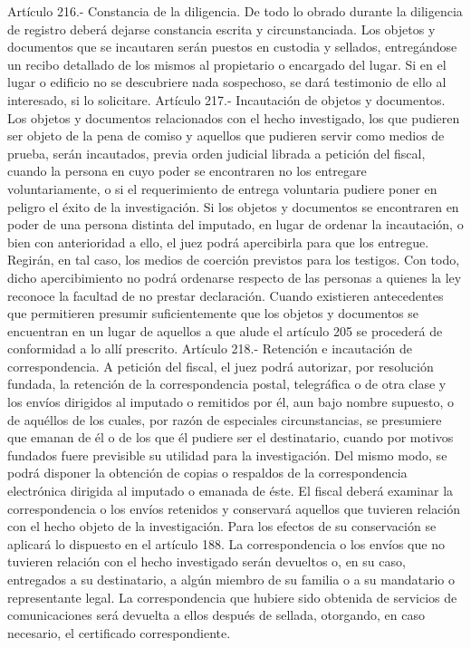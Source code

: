     Artículo 216.- Constancia de la diligencia. De todo lo obrado durante la diligencia de registro deberá dejarse constancia escrita y circunstanciada. Los objetos y documentos que se incautaren serán puestos en custodia y sellados, entregándose un recibo detallado de los mismos al propietario o encargado del lugar.
    Si en el lugar o edificio no se descubriere nada sospechoso, se dará testimonio de ello al interesado, si lo solicitare.
    Artículo 217.- Incautación de objetos y documentos. Los objetos y documentos relacionados con el hecho investigado, los que pudieren ser objeto de la pena de comiso y aquellos que pudieren servir como medios de prueba, serán incautados, previa orden judicial librada a petición del fiscal, cuando la persona en cuyo poder se encontraren no los entregare voluntariamente, o si el requerimiento de entrega voluntaria pudiere poner en peligro el éxito de la investigación.
    Si los objetos y documentos se encontraren en poder de una persona distinta del imputado, en lugar de ordenar la incautación, o bien con anterioridad a ello, el juez podrá apercibirla para que los entregue. Regirán, en tal caso, los medios de coerción previstos para los testigos. Con todo, dicho apercibimiento no podrá ordenarse respecto de las personas a quienes la ley reconoce la facultad de no prestar declaración.
    Cuando existieren antecedentes que permitieren presumir suficientemente que los objetos y documentos se encuentran en un lugar de aquellos a que alude el artículo 205 se procederá de conformidad a lo allí prescrito.
    Artículo 218.- Retención e incautación de correspondencia. A petición del fiscal, el juez podrá autorizar, por resolución fundada, la retención de la correspondencia postal, telegráfica o de otra clase y los envíos dirigidos al imputado o remitidos por él, aun bajo nombre supuesto, o de aquéllos de los cuales, por razón de especiales circunstancias, se presumiere que emanan de él o de los que él pudiere ser el destinatario, cuando por motivos fundados fuere previsible su utilidad para la investigación. Del mismo modo, se podrá disponer la obtención de copias o respaldos de la correspondencia electrónica dirigida al imputado o emanada de éste.
    El fiscal deberá examinar la correspondencia o los envíos retenidos y conservará aquellos que tuvieren relación con el hecho objeto de la investigación. Para los efectos de su conservación se aplicará lo dispuesto en el artículo 188. La correspondencia o los envíos que no tuvieren relación con el hecho investigado serán devueltos o, en su caso, entregados a su destinatario, a algún miembro de su familia o a su mandatario o representante legal. La correspondencia que hubiere sido obtenida de servicios de comunicaciones será devuelta a ellos después de sellada, otorgando, en caso necesario, el certificado correspondiente.
